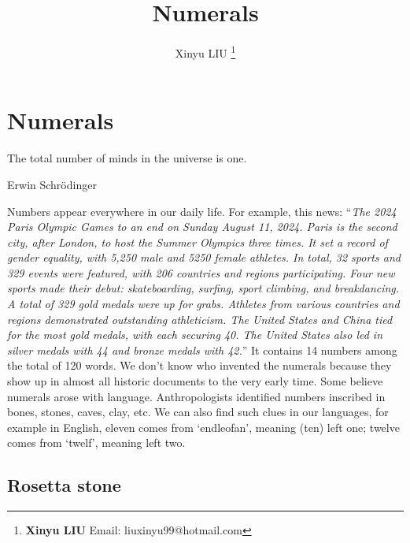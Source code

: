 \documentclass[b5paper]{article}
\begin{document}
\title{Numerals}

\author{Xinyu LIU
\thanks{{\bfseries Xinyu LIU} \newline
  Email: liuxinyu99@hotmail.com \newline}
  }

\maketitle
\fi


\ifx\wholebook\relax
\chapter{Numerals}
\fi

\epigraph{The total number of minds in the universe is one.}{Erwin Schrödinger}

Numbers appear everywhere in our daily life. For example, this news: \enquote{\textit{The 2024 Paris Olympic Games to an end on Sunday August 11, 2024. Paris is the second city, after London, to host the Summer Olympics three times. It set a record of gender equality, with 5,250 male and 5250 female athletes. In total, 32 sports and 329 events were featured, with 206 countries and regions participating. Four new sports made their debut: skateboarding, surfing, sport climbing, and breakdancing. A total of 329 gold medals were up for grabs. Athletes from various countries and regions demonstrated outstanding athleticism. The United States and China tied for the most gold medals, with each securing 40. The United States also led in silver medals with 44 and bronze medals with 42.}} It contains 14 numbers among the total of 120 words. We don't know who invented the numerals because they show up in almost all historic documents to the very early time. Some believe numerals arose with language. Anthropologists identified numbers inscribed in bones, stones, caves, clay, etc. We can also find such clues in our languages, for example in English, eleven comes from `endleofan', meaning (ten) left one; twelve comes from `twelf', meaning left two.

\section{Rosetta stone}
\end{document}

